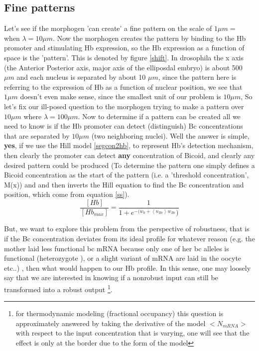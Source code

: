   \subsection{Fine patterns}
   Let's see if the morphogen 'can create' a fine pattern on the scale of $ 1 \mu m = $ when $ \lambda = 10 \mu m$. Now the morphogen creates the pattern by binding to the Hb promoter and stimulating Hb expression, so the Hb expression as a function of space is the 'pattern'.  This is denoted by figure \ref{shift}.  In drosophila the x axis (the Anterior Posterior axis, major axis of the elliposdal embryo) is about 500 $\mu m$ and each nucleus is separated by about 10 $ \mu m$, since the pattern here is referring to the expression of Hb as a function of nuclear position, we see that $ 1 \mu m$ doesn't even make sense, since the smallest unit of our problem is $10 \mu m$,  So let's fix our ill-posed question to the morphogen trying to make a pattern over  $ 10 \mu m $ where $ \lambda =100 \mu m $.  Now to determine if a pattern can be created all we need to know is if the Hb promoter can detect (distinguish) Bc concentrations that are separated by $ 10 \mu m $  (two neighboring nuclei).  Well the answer is simple, \textbf{yes}, if we use the Hill model \eqref{segcon2hb}, to represent Hb's detection mechanism, then clearly the promoter can detect \textbf{any} concentration of Bicoid, and clearly any desired pattern could be produced  (To determine the pattern one simply defines a Bicoid concentration as the start of the pattern (i.e. a 'threshold concentration', M(x)) and and then inverts the Hill equation to find the Bc concentration and position, which come from equation \eqref{ss}).
 \begin{equation}\label{segcon2hb}
    \frac{[Hb]}{[Hb_{max}]} = \frac{1}{1 + e^{ -(w_{0} +  \left< n_{Bc} \right> w_{Bc}})}
\end{equation}

 But, we want to explore this problem from the perspective of robustness, that is if the Bc concentration deviates from its ideal profile for whatever reason (e.g. the mother laid less functional bc mRNA because only one of her bc alleles is functional (heterozygote ), or a slight variant of mRNA are laid in the oocyte etc..) , then what would happen to our Hb profile.  In this sense, one may loosely say that we are interested in knowing if a nonrobust input can still be transformed into a robust output \footnote[2]{for thermodynamic modeling (fractional occupancy) this question is approximately answered by taking the derivative of the model $<N_{mRNA}>$ with respect to the input concentration that is varying, one will see that the effect is only at the border due to the form of the model}.

